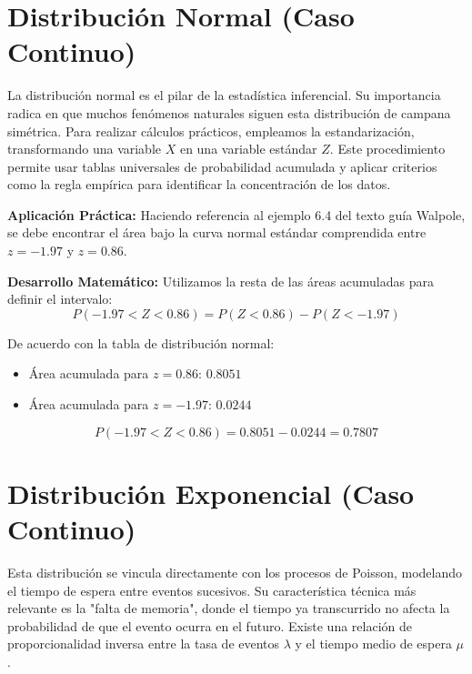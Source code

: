 \documentclass[12pt,a4paper]{article}
\begin{document}
\vspace{0.8cm}

\section{Distribución Normal (Caso Continuo)}

La distribución normal es el pilar de la estadística inferencial. Su importancia radica en que muchos fenómenos naturales siguen esta distribución de campana simétrica. Para realizar cálculos prácticos, empleamos la estandarización, transformando una variable $X$ en una variable estándar $Z$. Este procedimiento permite usar tablas universales de probabilidad acumulada y aplicar criterios como la regla empírica para identificar la concentración de los datos.

\vspace{0.4cm}
\textbf{Aplicación Práctica:} 
Haciendo referencia al ejemplo 6.4 del texto guía Walpole, se debe encontrar el área bajo la curva normal estándar comprendida entre $z = -1.97$ y $z = 0.86$.

\vspace{0.4cm}
\textbf{Desarrollo Matemático:}
Utilizamos la resta de las áreas acumuladas para definir el intervalo:
\[ P(-1.97 < Z < 0.86) = P(Z < 0.86) - P(Z < -1.97) \]

De acuerdo con la tabla de distribución normal:
\begin{itemize}
    \item Área acumulada para $z = 0.86$: $0.8051$
    \item Área acumulada para $z = -1.97$: $0.0244$
\end{itemize}

\[ P(-1.97 < Z < 0.86) = 0.8051 - 0.0244 = \mathbf{0.7807} \]

\newpage

\section{Distribución Exponencial (Caso Continuo)}

Esta distribución se vincula directamente con los procesos de Poisson, modelando el tiempo de espera entre eventos sucesivos. Su característica técnica más relevante es la "falta de memoria", donde el tiempo ya transcurrido no afecta la probabilidad de que el evento ocurra en el futuro. Existe una relación de proporcionalidad inversa entre la tasa de eventos $\lambda$ y el tiempo medio de espera $\mu$.
\end{document}
